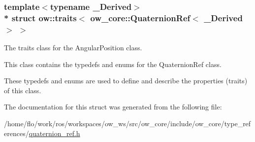 \subsubsection*{template$<$typename \+\_\+\+Derived$>$\\*
struct ow\+::traits$<$ ow\+\_\+core\+::\+Quaternion\+Ref$<$ \+\_\+\+Derived $>$ $>$}

The traits class for the Angular\+Position class. 

This class contains the typedefs and enums for the Quaternion\+Ref class.

These typedefs and enums are used to define and describe the properties (traits) of this class. 

The documentation for this struct was generated from the following file\+:\begin{DoxyCompactItemize}
\item 
/home/flo/work/ros/workspaces/ow\+\_\+ws/src/ow\+\_\+core/include/ow\+\_\+core/type\+\_\+references/\hyperlink{type__references_2quaternion__ref_8h}{quaternion\+\_\+ref.\+h}\end{DoxyCompactItemize}
